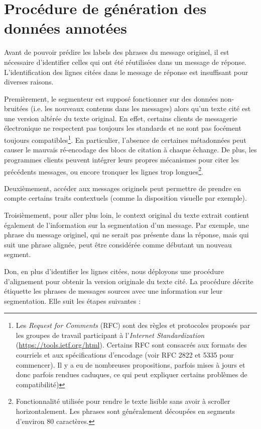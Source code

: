 \section{Procédure de génération des données annotées}

Avant de pouvoir prédire les labels des phrases du message originel, il est nécessaire d'identifier celles qui ont été réutilisées dans un message de réponse. L'identification des lignes citées dans le message de réponse est insuffisant pour diverses raisons.

Premièrement, le segmenteur est supposé fonctionner sur des données non-bruitées (i.e. les nouveaux contenus dans les messages) alors qu'un texte cité est une version altérée du texte original. En effet, certains clients de messagerie électronique ne respectent pas toujours les standards et ne sont pas focément toujours compatibles\footnote{Les \textit{Request for Comments} (RFC) sont des règles et protocoles proposés par les groupes de travail participant à l'\textit{Internet Standardization} (\url{https://tools.ietf.org/html}). Certains RFC sont consacrés aux formats des courriels et aux spécifications d'encodage (voir RFC 2822 et 5335 pour commencer). Il y a eu de nombreuses propositions, parfois mises à jours et donc parfois rendues caduques, ce qui peut expliquer certains problèmes de compatibilité)}. En particulier, l'absence de certaines métadonnées peut causer le mauvais ré-encodage des blocs de citation à chaque échange. De plus, les programmes clients peuvent intégrer leurs propres mécanismes pour citer les précédents messages, ou encore tronquer les lignes trop longues\footnote{Fonctionnalité utilisée pour rendre le texte lisible sans avoir à scroller horizontalement. Les phrases sont généralement découpées en segments d'environ 80 caractères.}.

Deuxièmement, accéder aux messages originels peut permettre de prendre en compte certains traits contextuels (comme la disposition visuelle par exemple).

Troisièmement, pour aller plus loin, le context original du texte extrait contient également de l'information sur la segmentation d'un message. Par exemple, une phrase du message originel, qui ne serait pas présente dans la réponse, mais qui suit une phrase alignée, peut être considérée comme débutant un nouveau segment.

Don, en plus d'identifier les lignes citées, nous déployons une procédure d'alignement pour obtenir la version originale du texte cité. La procédure décrite étiquette les phrases de messages sources avec une information sur leur segmentation. Elle suit les étapes suivantes :

